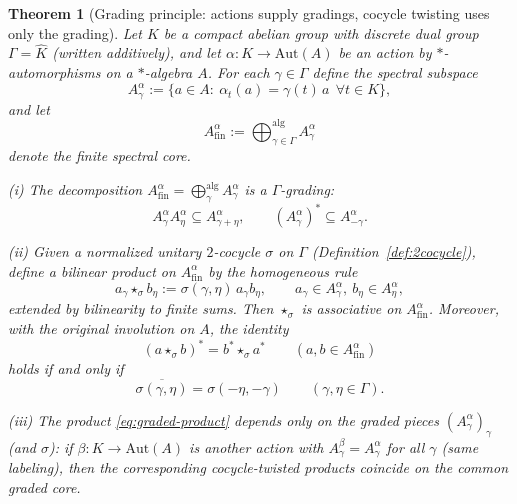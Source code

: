 \documentclass[11pt]{amsart}
\theoremstyle{plain}
\newtheorem{theorem}{Theorem}[section]
\theoremstyle{definition}
\theoremstyle{remark}
\begin{document}
\begin{theorem}[Grading principle: actions supply gradings, cocycle twisting uses only the grading]\label{thm:A}
Let $K$ be a compact abelian group with discrete dual group $\Gamma=\widehat K$ (written additively), and let
$\alpha:K\to\mathrm{Aut}(A)$ be an action by $*$-automorphisms on a $*$-algebra $A$.
For each $\gamma\in\Gamma$ define the spectral subspace
\[
A_\gamma^\alpha:=\{a\in A:\ \alpha_t(a)=\gamma(t)\,a\ \ \forall t\in K\},
\]
and let
\[
A_{\mathrm{fin}}^\alpha:=\bigoplus_{\gamma\in\Gamma}^{\mathrm{alg}}A_\gamma^\alpha
\]
denote the finite spectral core.

\smallskip
\noindent (i) The decomposition $A_{\mathrm{fin}}^\alpha=\bigoplus_{\gamma}^{\mathrm{alg}}A_\gamma^\alpha$ is a $\Gamma$-grading:
\[
A_\gamma^\alpha A_\eta^\alpha\subseteq A_{\gamma+\eta}^\alpha,\qquad (A_\gamma^\alpha)^*\subseteq A_{-\gamma}^\alpha.
\]

\smallskip
\noindent (ii) Given a normalized unitary $2$-cocycle $\sigma$ on $\Gamma$ (Definition~\ref{def:2cocycle}), define a bilinear product on
$A_{\mathrm{fin}}^\alpha$ by the homogeneous rule
\begin{equation}\label{eq:graded-product}
a_\gamma\star_\sigma b_\eta := \sigma(\gamma,\eta)\,a_\gamma b_\eta,
\qquad a_\gamma\in A_\gamma^\alpha,\ b_\eta\in A_\eta^\alpha,
\end{equation}
extended by bilinearity to finite sums. Then $\star_\sigma$ is associative on $A_{\mathrm{fin}}^\alpha$.
Moreover, with the \emph{original} involution on $A$, the identity
\[
(a\star_\sigma b)^*=b^*\star_\sigma a^*\qquad(a,b\in A_{\mathrm{fin}}^\alpha)
\]
holds if and only if
\begin{equation}\label{eq:cocycle-star-compat}
\overline{\sigma(\gamma,\eta)}=\sigma(-\eta,-\gamma)\qquad (\gamma,\eta\in\Gamma).
\end{equation}

\smallskip
\noindent (iii) The product \eqref{eq:graded-product} depends only on the graded pieces $(A_\gamma^\alpha)_\gamma$ (and $\sigma$):
if $\beta:K\to\mathrm{Aut}(A)$ is another action with $A_\gamma^\beta=A_\gamma^\alpha$ for all $\gamma$ (same labeling),
then the corresponding cocycle-twisted products coincide on the common graded core.
\end{theorem}
\end{document}
